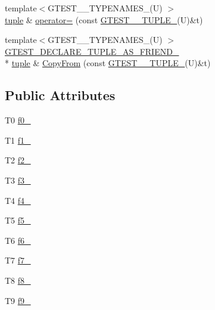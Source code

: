 \begin{DoxyCompactItemize}
\item 
{\footnotesize template$<$G\-T\-E\-S\-T\-\_\-\_\-\-T\-Y\-P\-E\-N\-A\-M\-E\-S\-\_\-(\-U) $>$ }\\\hyperlink{classstd_1_1tr1_1_1tuple}{tuple} \& \hyperlink{classstd_1_1tr1_1_1tuple_af0df06ea0529f3caa6cbbf9daaa4d341}{operator=} (const \hyperlink{namespacestd_1_1tr1_aa636d3269bf1f368a7bc09ff158bc482}{G\-T\-E\-S\-T\-\_\-\_\-\-T\-U\-P\-L\-E\-\_\-}(U)\&t)
\item 
{\footnotesize template$<$G\-T\-E\-S\-T\-\_\-\_\-\-T\-Y\-P\-E\-N\-A\-M\-E\-S\-\_\-(\-U) $>$ }\\\hyperlink{gtest-tuple_8h_a2b20671273f514a88a6e9b8328e5f257}{G\-T\-E\-S\-T\-\_\-\-D\-E\-C\-L\-A\-R\-E\-\_\-\-T\-U\-P\-L\-E\-\_\-\-A\-S\-\_\-\-F\-R\-I\-E\-N\-D\-\_\-} \\*
\hyperlink{classstd_1_1tr1_1_1tuple}{tuple} \& \hyperlink{classstd_1_1tr1_1_1tuple_aa76d0c02e6f4c6c99f32f9738623f23c}{Copy\-From} (const \hyperlink{namespacestd_1_1tr1_aa636d3269bf1f368a7bc09ff158bc482}{G\-T\-E\-S\-T\-\_\-\_\-\-T\-U\-P\-L\-E\-\_\-}(U)\&t)
\end{DoxyCompactItemize}
\subsection*{Public Attributes}
\begin{DoxyCompactItemize}
\item 
T0 \hyperlink{classstd_1_1tr1_1_1tuple_a133b02f631ce9c46c8368756d5ce7d68}{f0\-\_\-}
\item 
T1 \hyperlink{classstd_1_1tr1_1_1tuple_a809d974a332969e624830b02d9361107}{f1\-\_\-}
\item 
T2 \hyperlink{classstd_1_1tr1_1_1tuple_a1a3d444570fccf3810322a5cea025993}{f2\-\_\-}
\item 
T3 \hyperlink{classstd_1_1tr1_1_1tuple_a7d1ea537cc17e4c1aa1e4a7b39822c93}{f3\-\_\-}
\item 
T4 \hyperlink{classstd_1_1tr1_1_1tuple_a893ccbbb34a262058b4cfa5020bbf84e}{f4\-\_\-}
\item 
T5 \hyperlink{classstd_1_1tr1_1_1tuple_a1fbe806ede11f6e48aff17ce5c7b96a8}{f5\-\_\-}
\item 
T6 \hyperlink{classstd_1_1tr1_1_1tuple_a1b7ddbc9893546b3028ee8f4543534cc}{f6\-\_\-}
\item 
T7 \hyperlink{classstd_1_1tr1_1_1tuple_a254d543fc3669d5cbd41d5da833b9492}{f7\-\_\-}
\item 
T8 \hyperlink{classstd_1_1tr1_1_1tuple_a335bd9d920b8aff1e2a47980bbf274db}{f8\-\_\-}
\item 
T9 \hyperlink{classstd_1_1tr1_1_1tuple_a1b8a389f9e3974be4130f6ba2fbe5234}{f9\-\_\-}
\end{DoxyCompactItemize}
